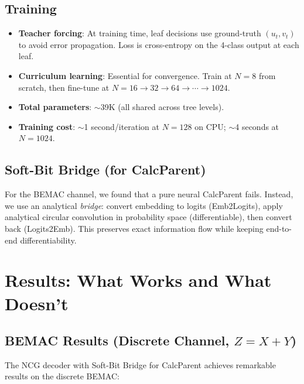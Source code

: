 \documentclass[10pt]{article}
\begin{document}
\subsection{Training}

\begin{itemize}[nosep]
    \item \textbf{Teacher forcing}: At training time, leaf decisions use ground-truth $(u_t, v_t)$ to avoid error propagation. Loss is cross-entropy on the 4-class output at each leaf.
    \item \textbf{Curriculum learning}: Essential for convergence. Train at $N = 8$ from scratch, then fine-tune at $N = 16 \to 32 \to 64 \to \cdots \to 1024$.
    \item \textbf{Total parameters}: $\sim$39K (all shared across tree levels).
    \item \textbf{Training cost}: $\sim$1 second/iteration at $N = 128$ on CPU; $\sim$4 seconds at $N = 1024$.
\end{itemize}

\subsection{Soft-Bit Bridge (for CalcParent)}

For the BEMAC channel, we found that a pure neural CalcParent fails. Instead, we use an analytical \emph{bridge}: convert embedding to logits (Emb2Logits), apply analytical circular convolution in probability space (differentiable), then convert back (Logits2Emb). This preserves exact information flow while keeping end-to-end differentiability.

\section{Results: What Works and What Doesn't}

\subsection{BEMAC Results (Discrete Channel, $Z = X + Y$)}

The NCG decoder with Soft-Bit Bridge for CalcParent achieves remarkable results on the discrete BEMAC:
\end{document}
